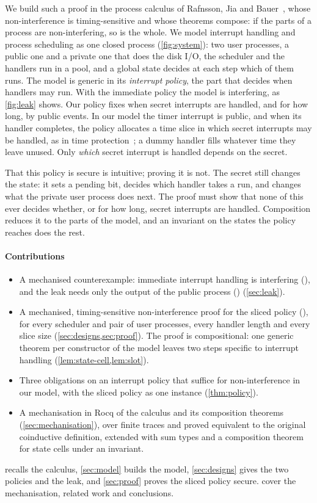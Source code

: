 We build such a proof in the process calculus of Rafnsson, Jia and
Bauer~\cite{rafnsson2017}, whose non-interference is timing-sensitive and whose
theorems compose: if the parts of a process are non-interfering, so is the whole. We model interrupt handling and process scheduling as
one closed process (\cref{fig:system}): two user processes, a public one and a
private one that does the disk I/O, the scheduler and the handlers run in a pool, and a global state decides at each step which of them runs.
The model is generic in its \emph{interrupt policy}, the part that decides when
handlers may run. With the immediate policy the model is interfering, as \cref{fig:leak} shows. Our
policy fixes when secret interrupts are handled, and for how long, by public events.
In our model the timer interrupt is public, and when its handler completes, the
policy allocates a time slice in which secret interrupts may be handled, as in time
protection~\cite{ge2019}; a dummy handler
fills whatever time they leave unused. Only \emph{which} secret interrupt is handled
depends on the secret.

That this policy is secure is intuitive; proving it is not. The secret still changes
the state: it sets a pending bit, decides which handler takes a run, and changes what
the private user process does next. The proof must show that none of this ever decides
whether, or for how long, secret interrupts are handled. Composition reduces it to the parts
of the model, and an invariant on the states the policy reaches does the rest.

\paragraph{Contributions}
\begin{itemize}
\item A mechanised counterexample: immediate interrupt handling is interfering
  (), and the leak needs only the output of the public
  process () (\cref{sec:leak}).
\item A mechanised, timing-sensitive non-interference proof for the sliced policy
  (), for every scheduler and pair of user
  processes, every handler length and every slice size
  (\cref{sec:designs,sec:proof}). The proof is compositional: one generic theorem per
  constructor of the model leaves two steps specific to interrupt handling
  (\cref{lem:state-cell,lem:slot}).
\item Three obligations on an interrupt policy that suffice for non-interference in
  our model, with the sliced policy as one instance (\cref{thm:policy}).
\item A mechanisation in Rocq of the calculus and its composition theorems
  (\cref{sec:mechanisation}), over finite traces and proved equivalent to the
  original coinductive definition, extended with sum types and a composition theorem
  for state cells under an invariant.
\end{itemize}

 recalls the calculus, \cref{sec:model} builds the model,
\cref{sec:designs} gives the two policies and the leak, and \cref{sec:proof} proves
the sliced policy secure.  cover
the mechanisation, related work and conclusions.
